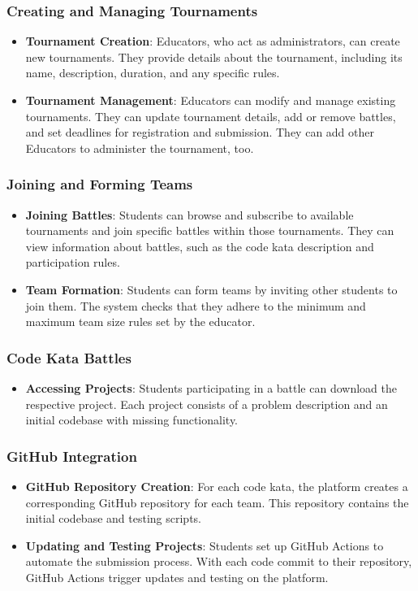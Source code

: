 \subsubsection{Creating and Managing Tournaments}
\begin{itemize}
    \item \textbf{Tournament Creation}: Educators, who act as administrators, can create new tournaments. They provide details about the tournament, including its name, description, duration, and any specific rules.
    \item \textbf{Tournament Management}: Educators can modify and manage existing tournaments. They can update tournament details, add or remove battles, and set deadlines for registration and submission. They can add other Educators to administer the tournament, too.
\end{itemize}

\subsubsection{Joining and Forming Teams}
\begin{itemize}
    \item \textbf{Joining Battles}: Students can browse and subscribe to available tournaments and join specific battles within those tournaments. They can view information about battles, such as the code kata description and participation rules.
    \item \textbf{Team Formation}: Students can form teams by inviting other students to join them. The system checks that they adhere to the minimum and maximum team size rules set by the educator.
\end{itemize}

\subsubsection{Code Kata Battles}
\begin{itemize}
    \item \textbf{Accessing Projects}: Students participating in a battle can download the respective project. Each project consists of a problem description and an initial codebase with missing functionality.
\end{itemize}
\subsubsection{GitHub Integration}
\begin{itemize}
    \item \textbf{GitHub Repository Creation}: For each code kata, the platform creates a corresponding GitHub repository for each team. This repository contains the initial codebase and testing scripts.
    \item \textbf{Updating and Testing Projects}: Students set up GitHub Actions to automate the submission process. With each code commit to their repository, GitHub Actions trigger updates and testing on the platform.
\end{itemize}
